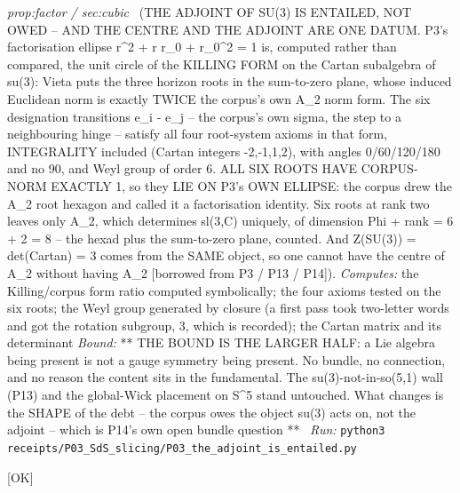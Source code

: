 \begin{description}
\textit{prop:factor / sec:cubic} \ (THE ADJOINT OF SU(3) IS ENTAILED, NOT OWED -- AND THE CENTRE AND THE ADJOINT ARE ONE DATUM. P3's factorisation ellipse r\textasciicircum{}2 + r r\_0 + r\_0\textasciicircum{}2 = 1 is, computed rather than compared, the unit circle of the KILLING FORM on the Cartan subalgebra of su(3): Vieta puts the three horizon roots in the sum-to-zero plane, whose induced Euclidean norm is exactly TWICE the corpus's own A\_2 norm form. The six designation transitions e\_i - e\_j -- the corpus's own sigma, the step to a neighbouring hinge -- satisfy all four root-system axioms in that form, INTEGRALITY included (Cartan integers -2,-1,1,2), with angles 0/60/120/180 and no 90, and Weyl group of order 6. ALL SIX ROOTS HAVE CORPUS-NORM EXACTLY 1, so they LIE ON P3's OWN ELLIPSE: the corpus drew the A\_2 root hexagon and called it a factorisation identity. Six roots at rank two leaves only A\_2, which determines sl(3,C) uniquely, of dimension \textbar{}Phi\textbar{} + rank = 6 + 2 = 8 -- the hexad plus the sum-to-zero plane, counted. And \textbar{}Z(SU(3))\textbar{} = det(Cartan) = 3 comes from the SAME object, so one cannot have the centre of A\_2 without having A\_2 [borrowed from P3 / P13 / P14]). 
\emph{Computes:} the Killing/corpus form ratio computed symbolically; the four axioms tested on the six roots; the Weyl group generated by closure (a first pass took two-letter words and got the rotation subgroup, 3, which is recorded); the Cartan matrix and its determinant
 \emph{Bound:} ** THE BOUND IS THE LARGER HALF: a Lie algebra being present is not a gauge symmetry being present. No bundle, no connection, and no reason the content sits in the fundamental. The su(3)-not-in-so(5,1) wall (P13) and the global-Wick placement on S\textasciicircum{}5 stand untouched. What changes is the SHAPE of the debt -- the corpus owes the object su(3) acts on, not the adjoint -- which is P14's own open bundle question **
\ \emph{Run:} \texttt{python3 receipts/P03\_SdS\_slicing/P03\_the\_adjoint\_is\_entailed.py}
\item[\rcptlabel{P03_sheet_index_and_factors}{P3R47}\textbf{P3R47}\quad\texttt{P03\_sheet\_index\_and\_factors}]\hfill\textsf{[OK]}\\

\end{description}
